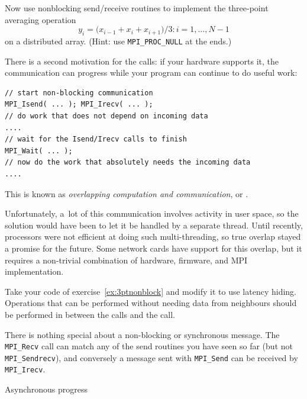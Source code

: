 \begin{exercise}
  \label{ex:3ptnonblock}
  Now use nonblocking send/receive routines to implement
  the three-point averaging operation
  \[ y_i=\bigl( x_{i-1}+x_i+x_{i+1} \bigr)/3\colon i=1,\ldots,N-1 \]
  on a distributed array. (Hint: use \lstinline$MPI_PROC_NULL$ at the ends.)
\end{exercise}

There is a second motivation for the  calls:
if your hardware supports it, the communication can progress
while your program can continue to do useful work:
\begin{lstlisting}
// start non-blocking communication
MPI_Isend( ... ); MPI_Irecv( ... );
// do work that does not depend on incoming data
....
// wait for the Isend/Irecv calls to finish
MPI_Wait( ... );
// now do the work that absolutely needs the incoming data
....
\end{lstlisting}
This is known as \emph{overlapping computation and communication}, or
.

Unfortunately, a~lot of this
communication involves activity in user space, so the solution would
have been to let it be handled by a separate thread. Until recently,
processors were not efficient at doing such multi-threading, so true
overlap stayed a promise for the future. Some network cards have
support for this overlap, but it requires a non-trivial combination of
hardware, firmware, and MPI implementation.

\begin{exercise}
  \label{ex:3ptnonblock-hide}
  Take your code of exercise~\ref{ex:3ptnonblock} and modify it to use
  latency hiding. Operations that can be performed without needing
  data from neighbours should be performed in between the
   calls and the  call.
\end{exercise}

\begin{remark}
  There is nothing special about a non-blocking or
  synchronous message. The \lstinline$MPI_Recv$ call can match any of the
  send routines you have seen so far (but not \lstinline$MPI_Sendrecv$), and
  conversely a message sent with \lstinline$MPI_Send$ can be received by \lstinline$MPI_Irecv$.
\end{remark}

 {Asynchronous progress}

